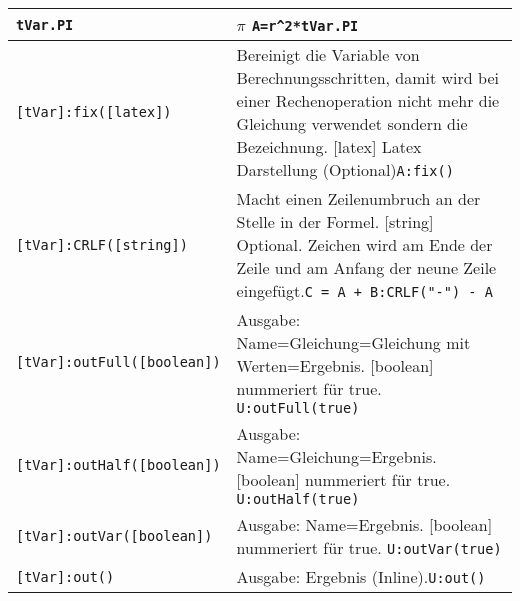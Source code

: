 \begin{table}[h]
	\begin{tabular}{|p{}|p{}|}
		\hline
		\lstinline{tVar.PI} & $\pi$  \newline \lstinline!A=r^2*tVar.PI!\\
		\hline
		\lstinline{[tVar]:fix([latex])} & Bereinigt die Variable von Berechnungsschritten, damit wird bei einer Rechenoperation nicht mehr die Gleichung verwendet sondern die Bezeichnung. [latex] Latex Darstellung (Optional)\newline \lstinline!A:fix()!\\
		\hline
		\lstinline{[tVar]:CRLF([string])} &Macht einen Zeilenumbruch an der Stelle in der Formel. [string] Optional. Zeichen wird am Ende der Zeile und am Anfang der neune Zeile eingefügt.\newline \lstinline!C = A + B:CRLF("-") - A!\\
		\hline
		\lstinline{[tVar]:outFull([boolean])} & Ausgabe: Name=Gleichung=Gleichung mit Werten=Ergebnis. [boolean] nummeriert für true.  \newline \lstinline!U:outFull(true) !\\
		\hline
		\lstinline{[tVar]:outHalf([boolean])} & Ausgabe: Name=Gleichung=Ergebnis. [boolean] nummeriert für true.  \newline \lstinline!U:outHalf(true) !\\
		\hline
		\lstinline{[tVar]:outVar([boolean])} & Ausgabe: Name=Ergebnis. [boolean] nummeriert für true.  \newline \lstinline!U:outVar(true) !\\
		\hline
		\lstinline{[tVar]:out()} & Ausgabe: Ergebnis (Inline).\newline \lstinline!U:out() !\\
		\hline
	\end{tabular}
\end{table}
